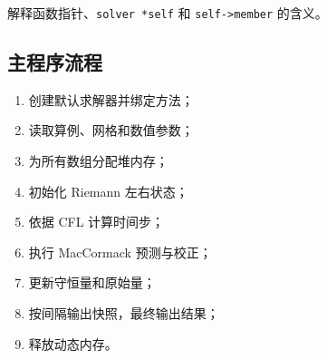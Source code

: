 解释函数指针、\texttt{solver *self} 和
\texttt{self->member} 的含义。

\subsection{主程序流程}

\begin{enumerate}[leftmargin=2em]
    \item 创建默认求解器并绑定方法；
    \item 读取算例、网格和数值参数；
    \item 为所有数组分配堆内存；
    \item 初始化 Riemann 左右状态；
    \item 依据 CFL 计算时间步；
    \item 执行 MacCormack 预测与校正；
    \item 更新守恒量和原始量；
    \item 按间隔输出快照，最终输出结果；
    \item 释放动态内存。
\end{enumerate}
